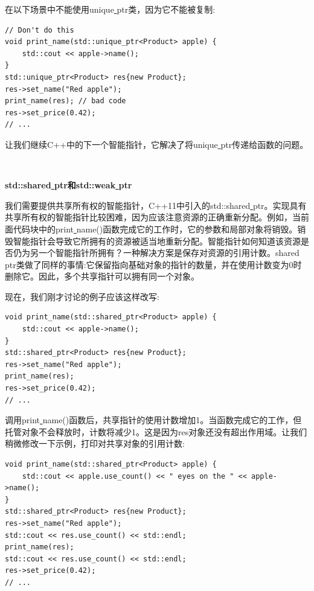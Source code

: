 在以下场景中不能使用unique\underline{ }ptr类，因为它不能被复制: \par

\begin{lstlisting}[caption={}]
// Don't do this
void print_name(std::unique_ptr<Product> apple) {
	std::cout << apple->name();
}
std::unique_ptr<Product> res{new Product};
res->set_name("Red apple");
print_name(res); // bad code
res->set_price(0.42);
// ...
\end{lstlisting}

让我们继续C++中的下一个智能指针，它解决了将unique\underline{ }ptr传递给函数的问题。 \par

\noindent\textbf{}\ \par
\textbf{std::shared\underline{ }ptr和std::weak\underline{ }ptr} \ \par
我们需要提供共享所有权的智能指针，C++11中引入的std::shared\underline{ }ptr。实现具有共享所有权的智能指针比较困难，因为应该注意资源的正确重新分配。例如，当前面代码块中的print\underline{ }name()函数完成它的工作时，它的参数和局部对象将销毁。销毁智能指针会导致它所拥有的资源被适当地重新分配。智能指针如何知道该资源是否仍为另一个智能指针所拥有？一种解决方案是保存对资源的引用计数。shared\underline{ }ptr类做了同样的事情:它保留指向基础对象的指针的数量，并在使用计数变为0时删除它。因此，多个共享指针可以拥有同一个对象。 \par
现在，我们刚才讨论的例子应该这样改写: \par

\begin{lstlisting}[caption={}]
void print_name(std::shared_ptr<Product> apple) {
	std::cout << apple->name();
}
std::shared_ptr<Product> res{new Product};
res->set_name("Red apple");
print_name(res);
res->set_price(0.42);
// ...
\end{lstlisting}

调用print\underline{ }name()函数后，共享指针的使用计数增加1。当函数完成它的工作，但托管对象不会释放时，计数将减少1。这是因为res对象还没有超出作用域。让我们稍微修改一下示例，打印对共享对象的引用计数: \par

\begin{lstlisting}[caption={}]
void print_name(std::shared_ptr<Product> apple) {
	std::cout << apple.use_count() << " eyes on the " << apple->name();
}
std::shared_ptr<Product> res{new Product};
res->set_name("Red apple");
std::cout << res.use_count() << std::endl;
print_name(res);
std::cout << res.use_count() << std::endl;
res->set_price(0.42);
// ...
\end{lstlisting}

